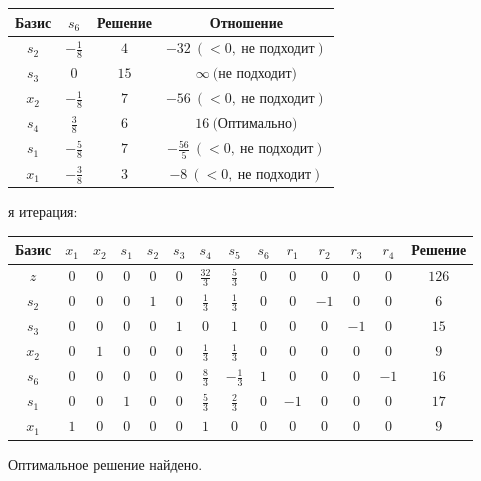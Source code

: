 \documentclass{article}%
\begin{document}
\begin{flushleft}
\begin{tabular}{|cccc|}
\hline%
Базис&$s_{6}$&Решение&Отношение\\%
\hline%
$s_{2}$&$-\frac{1}{8}$&$4$&$-32\: (< 0, \: \text{не подходит})$\\%
$s_{3}$&$0$&$15$&$\infty \: \text{(не подходит)}$\\%
$x_{2}$&$-\frac{1}{8}$&$7$&$-56\: (< 0, \: \text{не подходит})$\\%
$s_{4}$&$\frac{3}{8}$&$6$&$16\: \text{(Оптимально)}$\\%
$s_{1}$&$-\frac{5}{8}$&$7$&$-\frac{56}{5}\: (< 0, \: \text{не подходит})$\\%
$x_{1}$&$-\frac{3}{8}$&$3$&$-8\: (< 0, \: \text{не подходит})$\\%
\hline%
\end{tabular}%
\newline%
\newline%
я итерация: %
\newline%
\newline%
\renewcommand{\arraystretch}{1.3}%
\begin{tabular}{|c|cccccccccccc|c|}%
\hline%
Базис&$x_{1}$&$x_{2}$&$s_{1}$&$s_{2}$&$s_{3}$&$s_{4}$&$s_{5}$&$s_{6}$&$r_{1}$&$r_{2}$&$r_{3}$&$r_{4}$&Решение\\%
\hline%
$z$&$0$&$0$&$0$&$0$&$0$&$\frac{32}{3}$&$\frac{5}{3}$&$0$&$0$&$0$&$0$&$0$&$126$\\%
\hline%
$s_{2}$&$0$&$0$&$0$&$1$&$0$&$\frac{1}{3}$&$\frac{1}{3}$&$0$&$0$&$-1$&$0$&$0$&$6$\\%
$s_{3}$&$0$&$0$&$0$&$0$&$1$&$0$&$1$&$0$&$0$&$0$&$-1$&$0$&$15$\\%
$x_{2}$&$0$&$1$&$0$&$0$&$0$&$\frac{1}{3}$&$\frac{1}{3}$&$0$&$0$&$0$&$0$&$0$&$9$\\%
$s_{6}$&$0$&$0$&$0$&$0$&$0$&$\frac{8}{3}$&$-\frac{1}{3}$&$1$&$0$&$0$&$0$&$-1$&$16$\\%
$s_{1}$&$0$&$0$&$1$&$0$&$0$&$\frac{5}{3}$&$\frac{2}{3}$&$0$&$-1$&$0$&$0$&$0$&$17$\\%
$x_{1}$&$1$&$0$&$0$&$0$&$0$&$1$&$0$&$0$&$0$&$0$&$0$&$0$&$9$\\%
\hline%
\end{tabular}%
\newline%
\end{flushleft}%
Оптимальное решение найдено.%
\newline%
\end{document}
